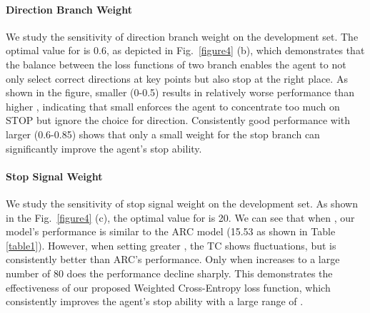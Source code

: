 \documentclass[11pt,a4paper]{article}
\begin{document}
\begin{figure*}[t]
\centering
{}\centering
\caption{(a) Task Completion (TC) scores with different thresholds for the stop signal ( in Equation \ref{Lstop}). TC shows insensitivity to different thresholds. (b) TC scores with different direction branch weights  in Equation \ref{Lloss}.  gives the highest TC. (c) TC scores with different stop signal weight  in Equation \ref{Lstop}.  gives the highest TC. All the experiments are done on the development set,}
\label{figure4}
\end{figure*}

\paragraph{Direction Branch Weight}
We study the sensitivity of direction branch weight  on the development set. The optimal value for  is 0.6, as depicted in Fig.~\ref{figure4} (b), which demonstrates that the balance between the loss functions of two branch enables the agent to not only select correct directions at key points but also stop at the right place. As shown in the figure, smaller  (0-0.5) results in relatively worse performance than higher , indicating that small  enforces the agent to concentrate too much on STOP but ignore the choice for direction. Consistently good performance with larger  (0.6-0.85) shows that only a small weight for the stop branch can significantly improve the agent's stop ability.
\paragraph{Stop Signal Weight}

We study the sensitivity of stop signal weight  on the development set. As shown in the Fig.~\ref{figure4} (c), the optimal value for  is 20. We can see that when , our model's performance is similar to the ARC model (15.53 as shown in Table \ref{table1}). However, when setting greater , the TC shows fluctuations, but is consistently better than ARC's performance. Only when  increases to a large number of 80 does the performance decline sharply. This demonstrates the effectiveness of our proposed Weighted Cross-Entropy loss function, which consistently improves the agent's stop ability with a large range of .
\end{document}
